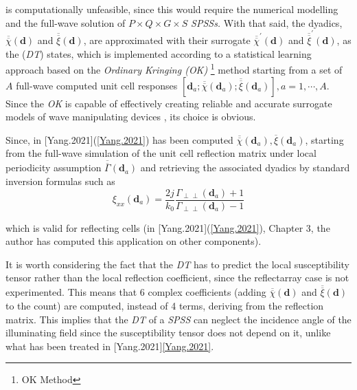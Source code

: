 is computationally unfeasible, since this would require the numerical
modelling and the full-wave solution of $P\times Q\times G\times S$
\emph{SPSSs.} With that said, the dyadics, $\overline{\overline{\chi}}(\mathbf{d})$
and $\overline{\overline{\xi}}(\mathbf{d})$, are approximated with
their surrogate $\overline{\overline{\chi}}^{\prime}(\mathbf{d})$
and $\overline{\overline{\xi}}^{\prime}(\mathbf{d})$, as the (\emph{DT})
states, which is implemented according to a statistical learning approach
based on the \emph{Ordinary Kringing (OK)}%
\footnote{OK Method%
}{\let\thefootnote\relax{}}
\emph{}method starting from a set of $A$ full-wave computed unit
cell responses $[\mathbf{d}_{a};\overline{\overline{\chi}}(\mathbf{d}_{a});\overline{\overline{\xi}}(\mathbf{d}_{a})],a=1,\cdots,A$.
Since the \emph{OK} is capable of effectively creating reliable and
accurate surrogate models of wave manipulating devices , its choice
is obvious. 

Since, in {[}Yang.2021{]}(\ref{Yang.2021}) has been computed $\overline{\overline{\chi}}(\mathbf{d}_{a}),\overline{\xi}(\mathbf{d}_{a})$,
starting from the full-wave simulation of the unit cell reflection
matrix under local periodicity assumption $\overline{\overline{\Gamma}}(\mathbf{d}_{a})$
and retrieving the associated dyadics by standard inversion formulas
such as\begin{equation}
\xi_{xx}(\mathbf{d}_{a})=\frac{2j}{k_{0}}\frac{\Gamma_{\perp\perp}(\mathbf{d}_{a})+1}{\Gamma_{\perp\perp}(\mathbf{d}_{a})-1}\label{eq:24}\end{equation}


which is valid for reflecting cells (in {[}Yang.2021{]}(\ref{Yang.2021}),
Chapter 3, the author has computed this application on other components).

It is worth considering the fact that the \emph{DT} has to predict
the local susceptibility tensor rather than the local reflection coefficient,
since the reflectarray case is not experimented. This means that 6
complex coefficients (adding $\overline{\overline{\chi}}(\mathbf{d})$
and $\overline{\overline{\xi}}(\mathbf{d})$ to the count) are computed,
instead of 4 terms, deriving from the reflection matrix. This implies
that the \emph{DT} of a \emph{SPSS} can neglect the incidence angle
of the illuminating field since the susceptibility tensor does not
depend on it, unlike what has been treated in {[}Yang.2021{]}\ref{Yang.2021}.

